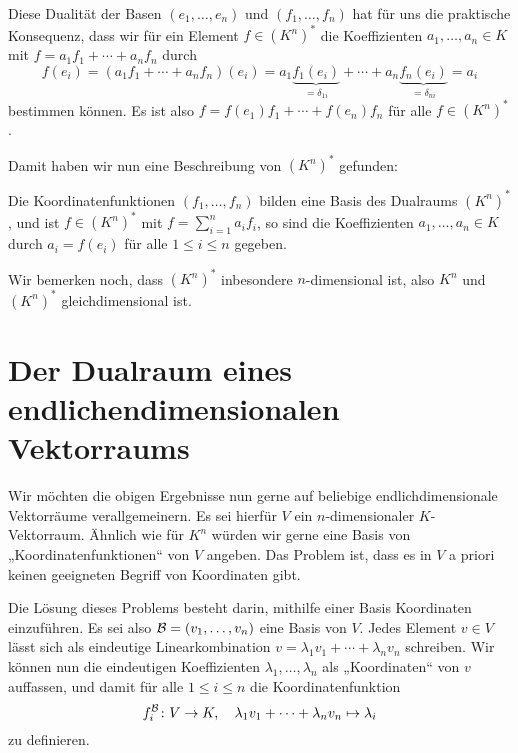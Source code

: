 \documentclass[a4paper,10pt]{article}
\begin{document}
Diese Dualität der Basen $(e_1, \dotsc, e_n)$ und $(f_1, \dotsc, f_n)$ hat für uns die praktische Konsequenz, dass wir für ein Element $f \in (K^n)^*$ die Koeffizienten $a_1, \dotsc, a_n \in K$ mit $f = a_1 f_1 + \dotsb + a_n f_n$ durch
\begin{equation}\label{eq: coefficients and duality}
 f(e_i)
 = (a_1 f_1 + \dotsb + a_n f_n)(e_i)
 = a_1 \underbrace{f_1(e_i)}_{=\delta_{1i}} + \dotsb + a_n \underbrace{f_n(e_i)}_{=\delta_{ni}}
 = a_i
\end{equation}
bestimmen können. Es ist also $f = f(e_1) f_1 + \dotsb + f(e_n) f_n$ für alle $f \in (K^n)^*$.

Damit haben wir nun eine Beschreibung von $(K^n)^*$ gefunden:

\begin{shaded}
 Die Koordinatenfunktionen $(f_1, \dotsc, f_n)$ bilden eine Basis des Dualraums $(K^n)^*$, und ist $f \in (K^n)^*$ mit $f = \sum_{i=1}^n a_i f_i$, so sind die Koeffizienten $a_1, \dotsc, a_n \in K$ durch $a_i = f(e_i)$ für alle $1 \leq i \leq n$ gegeben.
\end{shaded}

Wir bemerken noch, dass $(K^n)^*$ inbesondere $n$-dimensional ist, also $K^n$ und $(K^n)^*$ gleichdimensional ist.






\section{Der Dualraum eines endlichendimensionalen Vektorraums}
Wir möchten die obigen Ergebnisse nun gerne auf beliebige endlichdimensionale Vektorräume verallgemeinern. Es sei hierfür $V$ ein $n$-dimensionaler $K$-Vektorraum. Ähnlich wie für $K^n$ würden wir gerne eine Basis von „Koordinatenfunktionen“ von $V$ angeben. Das Problem ist, dass es in $V$ a priori keinen geeigneten Begriff von Koordinaten gibt.

Die Lösung dieses Problems besteht darin, mithilfe einer Basis Koordinaten einzuführen. Es sei also $\mathcal{B} = (v_1, \dotsc, v_n)$ eine Basis von $V$. Jedes Element $v \in V$ lässt sich als eindeutige Linearkombination $v = \lambda_1 v_1 + \dotsb + \lambda_n v_n$ schreiben. Wir können nun die eindeutigen Koeffizienten $\lambda_1, \dotsc, \lambda_n$ als „Koordinaten“ von $v$ auffassen, und damit für alle $1 \leq i \leq n$ die Koordinatenfunktion
\[
 f^{\mathcal{B}}_i \colon V \to K, \quad \lambda_1 v_1 + \dotsb + \lambda_n v_n \mapsto \lambda_i
\]
zu definieren.
\end{document}
